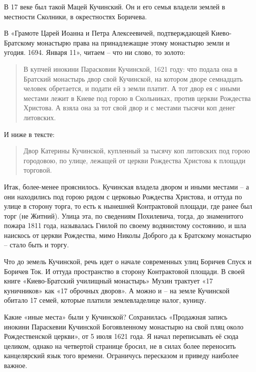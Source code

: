 В 17 веке был такой Мацей Кучинский. Он и его семья владели землей в местности Сколники, в окрестностях Боричева.

В «Грамоте Царей Иоанна и Петра Алексеевичей, подтверждающей Киево-Братскому монастырю права на принадлежащие этому монастырю земли и угодия. 1694. Января 11»\cite{sbornikmat}, читаем – что ни слово, то золото:

\begin{quotation}
В купчей инокини Парасковии Кучинской, 1621 году: что подала она в Братский монастырь двор свой Кучинской, на котором дворе семнадцать человек обретается, и подати ей з земли платит. А тот двор ея с иными местами лежит в Киеве под горою в Скольниках, против церкви Рождества Христова. А взяла она за тот свой двор и с местами тысячи коп денег литовских.
\end{quotation}

И ниже в тексте:

\begin{quotation}
Двор Катерины Кучинской, купленный за тысячу коп литовских под горою городовою, по улице, лежащей от церкви Рождества Христова к площади торговой.
\end{quotation}

Итак, более-менее прояснилось. Кучинская владела двором и иными местами – а они находились под горою рядом с церковью Рождества Христова, и оттуда по улице в сторону торга, то есть к нынешней Контрактовой площади, где ранее был торг (не Житний). Улица эта, по сведениям Похилевича\cite{pohilmon}, тогда, до знаменитого пожара 1811 года, называлась Гнилой по своему водянистому состоянию, и шла наискось от церкви Рождества, мимо Николы Доброго да к Братскому монастырю – стало быть и торгу.

Что до земель Кучинской, речь идет о начале современных улиц Боричев Спуск и Боричев Ток. И оттуда пространство в сторону Контрактовой площади. В своей книге «Киево-Братский училищный монастырь» Мухин трактует «17 куничников» как «17 оброчных дворов». А можно и – на земле Кучинской обитало 17 семей, которые платили землевладелице налог, куницу.

Какие «иные места» были у Кучинской? Сохранилась «Продажная запись инокини Параскевии Кучинской Богоявленному монастырю на свой пляц около Рождественской церкви»\cite{muhin01}, от 5 июля 1621 года. Я начал переписывать её сюда целиком, однако на четвертой странице бросил, не в силах более переносить канцелярский язык того времени. Ограничусь пересказом и приведу наиболее важное.

